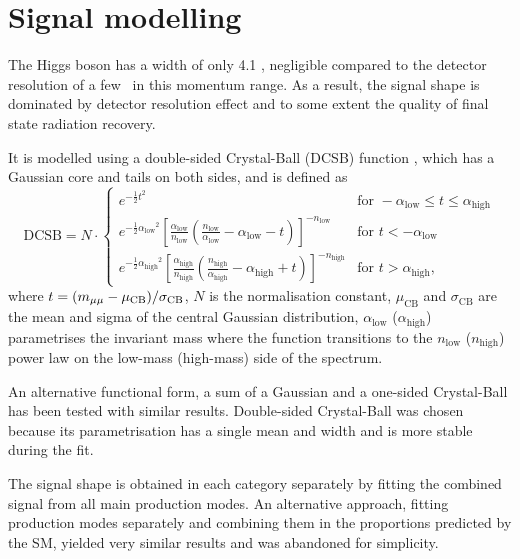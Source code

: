 \section{Signal modelling}

The Higgs boson has a width of only 4.1 \MeV, negligible compared
to the detector resolution of a few \GeV~in this momentum range.
As a result, the signal shape is dominated by detector resolution
effect and to some extent the quality of final state radiation
recovery.

It is modelled using a double-sided Crystal-Ball (DCSB) function
\cite{Oreglia:1980cs}, which has a Gaussian core
and tails on both sides, and is defined as \cite{Aaboud:2016tru}
\begin{equation}
\newcommand{\alow}{\alpha_\text{low}}
\newcommand{\ahigh}{\alpha_\text{high}}
\newcommand{\nlow}{n_\text{low}}
\newcommand{\nhigh}{n_\text{high}}
\newcommand{\for}{\text{for }}
    \text{DCSB} = N \cdot
    \begin{cases}
      e^{-\frac{1}{2}t^2}              &  \for -\alow \leq t \leq \ahigh \\
      e^{-\frac{1}{2}\alow^2} \left[ \frac{\alow}{\nlow} \left( \frac{\nlow}{\alow} -\alow - t \right) \right]^{-\nlow}  & \for t < -\alow \\
      e^{-\frac{1}{2}\ahigh^2} \left[ \frac{\ahigh}{\nhigh} \left( \frac{\nhigh}{\ahigh} -\ahigh + t \right) \right]^{-\nhigh}  & \for t > \ahigh,
    \end{cases}
\end{equation}
where $t = (m_{\mu\mu} - \mu_\text{CB}) / \sigma_\text{CB}$, $N$ is the
normalisation constant, $\mu_\text{CB}$ and $\sigma_\text{CB}$ are
the mean and sigma of the central Gaussian distribution,
$\alpha_\text{low}$ ($\alpha_\text{high}$) parametrises the
invariant mass where the function transitions to the $n_\text{low}$
($n_\text{high}$) power law on the low-mass (high-mass) side of
the spectrum.

An alternative functional form, a sum of
a Gaussian and a one-sided Crystal-Ball has been tested with similar
results. Double-sided Crystal-Ball was chosen because its
parametrisation has a single mean and width and is more stable
during the fit.

The signal shape is obtained in each category separately by fitting
the combined signal from all main production modes. An alternative
approach, fitting production modes separately and combining them
in the proportions predicted by the SM, yielded very similar results
and was abandoned for simplicity.

